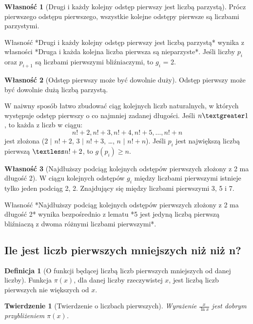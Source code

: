 \documentclass[10pt,onecolumn]{article}
\newtheorem{theorem}{Twierdzenie}
\theoremstyle{definition}
\newtheorem{definition}{Definicja}
\theoremstyle{hypothesis}
\theoremstyle{capability}
\newtheorem{capability}{Własność}
\begin{document}
\begin{capability}[Drugi i każdy kolejny odstęp pierwszy jest liczbą parzystą]
Prócz pierwszego odstępu pierwszego, wszystkie kolejne odstępy pierwsze są liczbami parzystymi.
\end{capability}

Własność *Drugi i każdy kolejny odstęp pierwszy jest liczbą parzystą* wynika z własności *Druga i każda kolejna liczba pierwsza są nieparzyste*. Jeśli liczby $p_i$ oraz $p_{i+1}$ są liczbami pierwszymi bliźniaczymi, to $g_i$ = 2. 

\begin{capability}[Odstęp pierwszy może być dowolnie duży]
Odstęp pierwszy może być dowolnie dużą liczbą parzystą.
\end{capability}

W naiwny sposób łatwo zbudować ciąg kolejnych liczb naturalnych, w których występuje odstęp pierwszy o co najmniej zadanej długości. Jeśli $n \textgreater 1$, to każda z liczb w ciągu: $$n!+2, n!+3, n!+4, n!+5, \ldots, n!+n$$ jest złożona ($2$ $\mid$ $n!+2$, $3$ $\mid$ $n!+3$, \ldots, $n$ $\mid$ $n!+n$). Jeśli $p_i$ jest największą liczbą pierwszą $\textless n!+2$, to $g(p_i) \geq n$. 

\begin{capability}[Najdłuższy podciąg kolejnych odstępów pierwszych złożony z 2 ma długość 2]
W ciągu kolejnych odstępów $g_i$ między liczbami pierwszymi istnieje tylko jeden podciąg 2, 2. Znajdujący się między liczbami pierwszymi 3, 5 i 7.
\end{capability}

Własność *Najdłuższy podciąg kolejnych odstępów pierwszych złożony z 2 ma długość 2* wynika bezpośrednio z lematu *5 jest jedyną liczbą pierwszą bliźniaczą z dwoma różnymi liczbami pierwszymi*.

\subsection{Ile jest liczb pierwszych mniejszych niż niż n?}

\begin{definition} [O funkcji będącej liczbą liczb pierwszych mniejszych od danej liczby]
Funkcja $\pi (x)$, dla danej liczby rzeczywistej $x$, jest liczbą liczb pierwszych nie większych od $x$.
\end{definition}

\begin{theorem}[Twierdzenie o liczbach pierwszych]
Wyrażenie $\frac {x}{\ln x}$ jest dobrym przybliżeniem $\pi (x)$.
\end{theorem}
\end{document}
